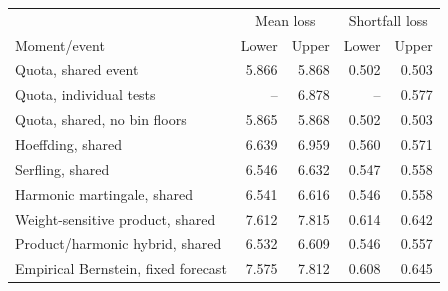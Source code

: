 \begin{tabular}{lrrrr}
\toprule
 & \multicolumn{2}{c}{Mean loss} & \multicolumn{2}{c}{Shortfall loss}\\
Moment/event & Lower & Upper & Lower & Upper\\
\midrule
Quota, shared event & 5.866 & 5.868 & 0.502 & 0.503\\
Quota, individual tests & -- & 6.878 & -- & 0.577\\
Quota, shared, no bin floors & 5.865 & 5.868 & 0.502 & 0.503\\
Hoeffding, shared & 6.639 & 6.959 & 0.560 & 0.571\\
Serfling, shared & 6.546 & 6.632 & 0.547 & 0.558\\
Harmonic martingale, shared & 6.541 & 6.616 & 0.546 & 0.558\\
Weight-sensitive product, shared & 7.612 & 7.815 & 0.614 & 0.642\\
Product/harmonic hybrid, shared & 6.532 & 6.609 & 0.546 & 0.557\\
Empirical Bernstein, fixed forecast & 7.575 & 7.812 & 0.608 & 0.645\\
\bottomrule
\end{tabular}
